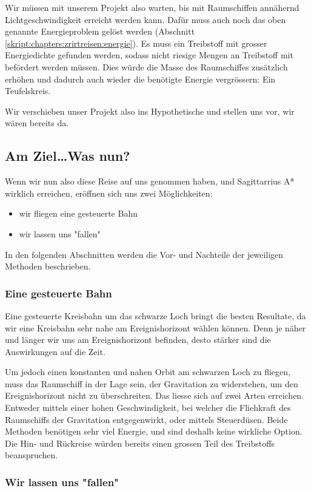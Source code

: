 \begin{refsection}
	Wir müssen mit unserem Projekt also warten, bis mit Raumschiffen annähernd Lichtgeschwindigkeit erreicht werden kann. Dafür muss auch noch das oben genannte Energieproblem gelöst werden (Abschnitt \ref{skript:chapters:zrirtreisen:energie}). Es muss ein Treibstoff mit grosser Energiedichte gefunden werden, sodass nicht riesige Mengen an Treibstoff mit befördert werden müssen. Dies würde die Masse des Raumschiffes zusätzlich erhöhen und dadurch auch wieder die benötigte Energie vergrössern: Ein Teufelskreis.
    
	Wir verschieben unser Projekt also ins Hypothetische und stellen uns vor, wir wären bereits da.
	
	\subsection{Am Ziel\dots Was nun?}
	Wenn wir nun also diese Reise auf uns genommen haben, und Sagittarrius A* wirklich erreichen, eröffnen sich uns zwei Möglichkeiten:
	\begin{itemize}
		\item wir fliegen eine gesteuerte Bahn
		\item wir lassen uns "fallen"
	\end{itemize}
	In den folgenden Abschnitten werden die Vor- und Nachteile der jeweiligen Methoden beschrieben.
	
	\subsubsection{Eine gesteuerte Bahn}
	Eine gesteuerte Kreisbahn um das schwarze Loch bringt die besten Resultate, da wir eine Kreisbahn sehr nahe am Ereignishorizont wählen können. Denn je näher und länger wir uns am Ereignishorizont befinden, desto stärker sind die Auswirkungen auf die Zeit. 
    
	Um jedoch einen konstanten und nahen Orbit am schwarzen Loch zu fliegen, muss das Raumschiff in der Lage sein, der Gravitation zu widerstehen, um den Ereignishorizont nicht zu überschreiten. Das liesse sich auf zwei Arten erreichen. Entweder mittels einer hohen Geschwindigkeit, bei welcher die Fliehkraft des Raumschiffs der Gravitation entgegenwirkt, oder mittels Steuerdüsen. 
	Beide Methoden benötigen sehr viel Energie, und sind deshalb keine wirkliche Option. Die Hin- und Rückreise würden bereits einen grossen Teil des Treibstoffs beanspruchen.
	\subsubsection{Wir lassen uns "fallen"}
	

\end{refsection}
